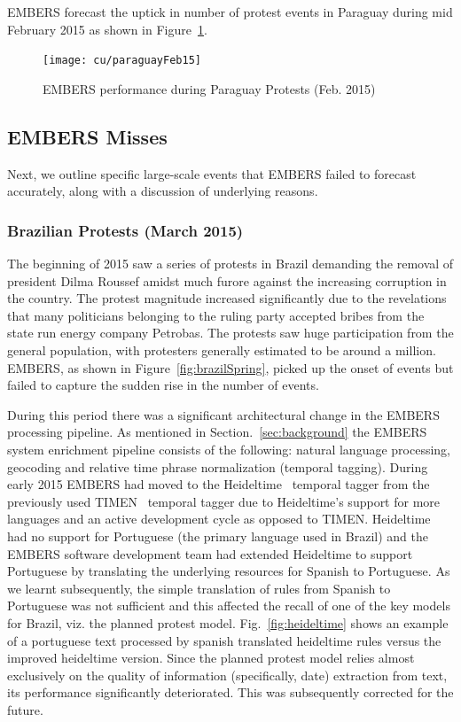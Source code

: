 EMBERS forecast the uptick in number of protest events in Paraguay during mid
February 2015 as shown in Figure~\ref{fig:paraguay15}.

\begin{figure}[H]
\centering
\texttt{[image: cu/paraguayFeb15]}
\caption{EMBERS performance during Paraguay Protests (Feb. 2015)}
\label{fig:paraguay15}
\end{figure}

\subsection{EMBERS Misses}
Next, we outline specific large-scale events that
EMBERS failed to forecast accurately, along with a discussion of underlying
reasons.

\subsubsection{Brazilian Protests (March 2015)}
The beginning of 2015 saw a series of protests in Brazil demanding the
removal of president Dilma Roussef amidst much furore against the increasing corruption in the country.
The protest magnitude increased significantly due to the revelations that many politicians belonging
to the ruling party accepted bribes from the state run energy company Petrobas. The protests saw huge participation from
the general population, with protesters generally estimated to be around a
million. EMBERS, as shown in Figure~\ref{fig:brazilSpring},
picked up the onset of events but failed to capture the sudden rise in the number of events.

During this period there was a significant architectural change in the
EMBERS processing pipeline. As mentioned in Section.~\ref{sec:background} the
EMBERS system enrichment pipeline consists of the following: natural language processing,
geocoding and relative time phrase normalization (temporal tagging). During early 2015
EMBERS had moved to the Heideltime~\cite{heideltime} temporal
tagger from the previously used TIMEN~\cite{timen} temporal tagger due to
Heideltime's support for more languages and an active development cycle as
opposed to TIMEN. 
Heideltime had no support for Portuguese (the primary
language used in Brazil) and the EMBERS software development team had extended Heideltime to
support Portuguese by translating the underlying
resources for Spanish to Portuguese. As we learnt subsequently,
the simple translation of rules from Spanish to Portuguese
was not sufficient and this affected the recall of one of the key models
for Brazil, viz. the planned protest model. Fig.~\ref{fig:heideltime} shows an example of a portuguese
text processed by spanish translated heideltime rules versus the improved heideltime version. 
Since the planned protest model relies
almost exclusively on the quality of information (specifically, date) extraction from text,
its performance significantly deteriorated. This was subsequently corrected for the future.

